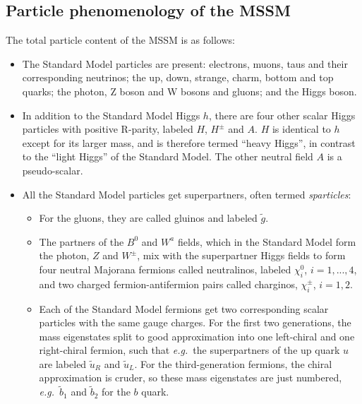 \documentclass[twoside,english]{uiofysmaster}
\begin{document}
\subsection{Particle phenomenology of the MSSM}
The total particle content of the MSSM is as follows: 
\begin{itemize}
	\item The Standard Model particles are present: electrons, muons, taus and their corresponding neutrinos; the up, down, strange, charm, bottom and top quarks; the photon, Z boson and W bosons and gluons; and the Higgs boson.
	\item In addition to the Standard Model Higgs $h$, there are four other scalar Higgs particles with positive R-parity, labeled $H$, $H^\pm$ and $A$. $H$ is identical to $h$ except for its larger mass, and is therefore termed ``heavy Higgs'', in contrast to the ``light Higgs'' of the Standard Model. The other neutral field $A$ is a pseudo-scalar.
	\item All the Standard Model particles get superpartners, often termed {\it sparticles}:
	\begin{itemize}
	 	\item For the gluons, they are called gluinos and labeled $\tilde g$. 
	 	\item The partners of the $B^0$ and $W^a$ fields, which in the Standard Model form the photon, $Z$ and $W^\pm$, mix with the superpartner Higgs fields to form four neutral Majorana fermions called neutralinos, labeled $\chi_i^0$, $i=1,...,4$, and two charged fermion-antifermion pairs called charginos, $\chi_i^\pm$, $i=1,2$. 
	 	\item Each of the Standard Model fermions get two corresponding scalar particles with the same gauge charges. For the first two generations, the mass eigenstates split to good approximation into one left-chiral and one right-chiral fermion, such that {\it e.g.}\ the superpartners of the up quark $u$ are labeled $\tilde u_R$ and $\tilde u_L$. For the third-generation fermions, the chiral approximation is cruder, so these mass eigenstates are just numbered, {\it e.g.}\ $\tilde b_1$ and $\tilde b_2$ for the $b$ quark. 
	 \end{itemize} 
 \end{itemize}
\end{document}
